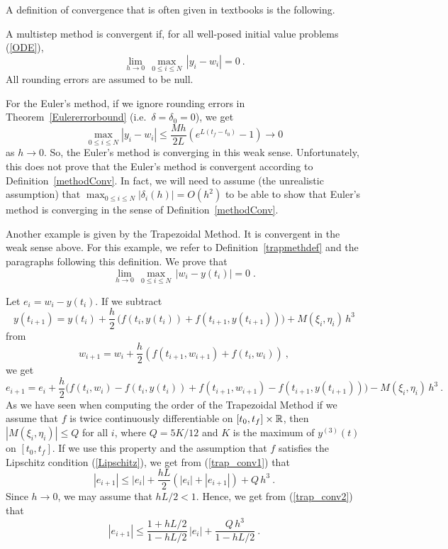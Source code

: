 \begin{rmk}
A definition of convergence that is often given in textbooks is the
following.  \label{AltDefConv}

A multistep method is convergent if, for all
well-posed initial value problems (\ref{ODE}),
\[
\lim_{h \rightarrow 0}\,\max_{0\leq i \leq N} \,|y_i - w_i| = 0 \ .
\]
All rounding errors are assumed to be null.

For the Euler's method, if we ignore rounding errors
in Theorem~\ref{Eulererrorbound} (i.e.\ $\delta=\delta_0=0$), we get
\[
\max_{0\leq i \leq N} |y_i - w_i| \leq \frac{Mh}{2L}\left(e^{L(t_f -t_0)} -1 \right)
\rightarrow 0
\]
as $h \rightarrow 0$.  So, the Euler's method is
converging in this weak sense.  Unfortunately, this does not
prove that the Euler's method is convergent according to
Definition~\ref{methodConv}.  In fact, we will need to assume
(the unrealistic assumption) that
$\displaystyle \max_{0\leq i \leq N} |\delta_i(h)| = O(h^2)$ to be
able to show that Euler's method is converging in the sense of
Definition~\ref{methodConv}.   

Another example is given by the Trapezoidal Method.  It is convergent in
the weak sense above.  For this example, we refer to
Definition~\ref{trapmethdef} and the paragraphs following this
definition.  We prove that
\begin{equation} \label{trap_conv0}
\lim_{h\rightarrow 0}\,\max_{0\leq i \leq N}\,|w_i-y(t_i)| = 0 \;.
\end{equation}

Let $e_i = w_i - y(t_i)$.  If we subtract
\[
y(t_{i+1}) = y(t_i) + \frac{h}{2}\,\big(
f(t_i,y(t_i)) + f(t_{i+1},y(t_{i+1})) \big) + M(\xi_i,\eta_i)\,h^3
\]
from
\[
w_{i+1} = w_i + \frac{h}{2} \left(f(t_{i+1},w_{i+1}) +f(t_i,w_i)
\right) \ ,
\]
we get
\begin{equation} \label{trap_conv1}
e_{i+1} = e_i + \frac{h}{2}\bigg( f(t_i,w_i) -
f(t_i,y(t_i)) + f(t_{i+1},w_{i+1}) - f(t_{i+1},y(t_{i+1})) \bigg)
- M(\xi_i,\eta_i)\,h^3 \ .
\end{equation}
As we have seen when computing the order of the Trapezoidal Method
if we assume that $f$ is twice continuously differentiable on
$[t_0,t_f]\times\mathbb{R}$, then $| M(\xi_i, \eta_i)| \leq Q$ for all $i$, where
$Q = 5K/12$ and $K$ is the maximum of $y^{(3)}(t)$ on $[t_0,t_f]$.
If we use this property and the assumption that $f$ satisfies the
Lipschitz condition (\ref{Lipschitz}), we get from (\ref{trap_conv1}) that
\begin{equation} \label{trap_conv2}
|e_{i+1}| \leq |e_i| + \frac{hL}{2}\left( |e_i| + |e_{i+1}| \right)
+ Q\,h^3 \ .
\end{equation}
Since $h\rightarrow 0$, we may assume that $hL/2 < 1$.  Hence, 
we get from (\ref{trap_conv2}) that
\begin{equation} \label{trap_conv3}
|e_{i+1}| \leq \frac{1 + hL/2}{1-hL/2}\,|e_i|
+\frac{Q\,h^3}{1-hL/2} \ .
\end{equation}


\end{rmk}
